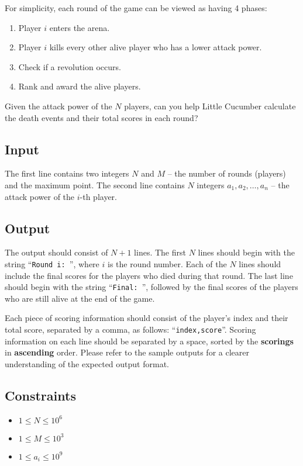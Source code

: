 For simplicity, each round of the game can be viewed as having 4 phases:
\vspace{-6pt}
\begin{enumerate}[leftmargin=50pt]
\tightlist
    \item Player $i$ enters the arena.
    \item Player $i$ kills every other alive player who has a lower attack power. 
    \item Check if a revolution occurs. 
    \item Rank and award the alive players. 
\end{enumerate}

Given the attack power of the $N$ players, can you help Little Cucumber calculate the death events and their total scores in each round?

\subsection{Input}\label{input}

The first line contains two integers $N$ and $M$ -- the number of rounds (players) and the maximum point. 
The second line contains $N$ integers $a_1, a_2, \dots, a_n$ -- the attack power of the $i$-th player.

\subsection{Output}\label{output}

The output should consist of $N+1$ lines. 
The first $N$ lines should begin with the string ``\texttt{Round i: }'', where $i$ is the round number. 
Each of the $N$ lines should include the final scores for the players who died during that round. 
The last line should begin with the string ``\texttt{Final: }'', followed by the final scores of the players who are still alive at the end of the game.

Each piece of scoring information should consist of the player's index and their total score, separated by a comma, as follows: ``\texttt{index,score}''. 
Scoring information on each line should be separated by a space, sorted by the \textbf{scorings} in \textbf{ascending} order.
Please refer to the sample outputs for a clearer understanding of the expected output format. 

\subsection{Constraints} \label{constraint}
\begin{itemize}
\tightlist
    \item $1 \le N \le 10^6$
    \item $1 \le M \le 10^3$
    \item $1 \le a_i \le 10^9$
\end{itemize}

